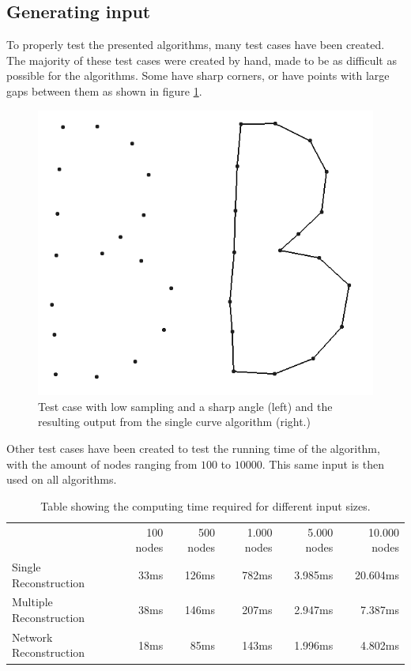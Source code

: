 \documentclass[11pt]{article}
\begin{document}
\subsection{Generating input}
To properly test the presented algorithms, many test cases have been created. The majority of these test cases were created by hand, made to be as difficult as possible for the algorithms. Some have sharp corners, or have points with large gaps between them as shown in figure \ref{single}.

\begin{figure}[ht!]
\centering
\includegraphics[scale=0.2]{anglesamplerate.png}
\caption{Test case with low sampling and a sharp angle (left) and the resulting output from the single curve algorithm (right.)}
\label{single}
\end{figure}

Other test cases have been created to test the running time of the algorithm, with the amount of nodes ranging from $100$ to $10000$. This same input is then used on all algorithms.

\begin{table}[ht!]
    \begin{tabular}{lrrrrr}
    ~                       & 100 nodes & 500 nodes & 1.000 nodes & 5.000 			nodes & 10.000 nodes \\
    Single Reconstruction   & 33ms      & 126ms     & 782ms       & 3.985ms     	& 20.604ms     \\
    Multiple Reconstruction & 38ms      & 146ms     & 207ms       & 2.947ms     	& 7.387ms      \\
    Network Reconstruction  & 18ms      & 85ms      & 143ms       & 1.996ms     	& 4.802ms      \\
    \end{tabular}
\caption{Table showing the computing time required for different input sizes.}
\end{table}
\end{document}
